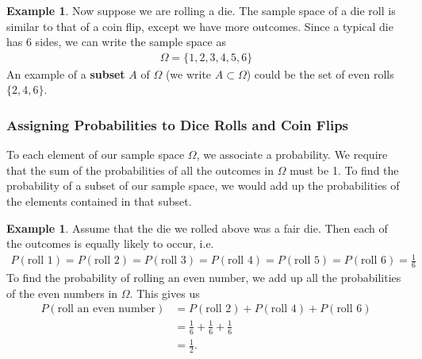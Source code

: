 \documentclass[11pt,letterpaper]{article}
\numberwithin{theorem}{section}
\numberwithin{definition}{section}
\numberwithin{lemma}{section}
\numberwithin{corollary}{section}
\numberwithin{proposition}{section}
\theoremstyle{definition}
\numberwithin{remark}{section}
\numberwithin{claim}{section}
\numberwithin{observation}{section}
\numberwithin{fact}{section}
\numberwithin{assumption}{section}
\newtheorem{example}[theorem]{Example}
\numberwithin{example}{section}
\numberwithin{exercise}{section}
\begin{document}
\begin{example}
Now suppose we are rolling a die. The sample space of a die roll is similar to that of a coin flip, except we have more outcomes. Since a typical die has 6 sides, we can write the sample space as
\begin{align*}
\Omega = \{1,2,3,4,5,6\}
\end{align*}
An example of a \textbf{subset} $A$ of $\Omega$ (we write $A \subset \Omega$) could be the set of even rolls $\{2,4,6\}$. \end{example}

\subsubsection{Assigning Probabilities to Dice Rolls and Coin Flips}
To each element of our sample space $\Omega$, we associate a probability. We require that the sum of the probabilities of all the outcomes in $\Omega$ must be 1. To find the probability of a subset of our sample space, we would add up the probabilities of the elements contained in that subset.

\begin{example}
Assume that the die we rolled above was a fair die. Then each of the outcomes is equally likely to occur, i.e.
\begin{align*}
P(\text{roll 1}) = P(\text{roll 2}) = P(\text{roll 3}) = P(\text{roll 4}) = P(\text{roll 5}) = P(\text{roll 6}) = \frac{1}{6}
\end{align*}
To find the probability of rolling an even number, we add up all the probabilities of the even numbers in $\Omega$. This gives us
\begin{align*}
P(\text{roll an even number}) &= P(\text{roll 2}) + P(\text{roll 4}) + P(\text{roll 6}) \\
&= \frac{1}{6} + \frac{1}{6} + \frac{1}{6} \\
&= \frac{1}{2}.
\end{align*}
\end{example}
\end{document}
